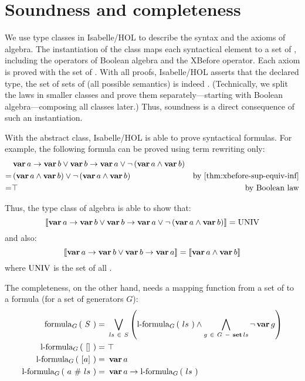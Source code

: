 \section{Soundness and completeness}
\label{sec:algebras-soundness-and-completeness}

We use type classes in Isabelle/HOL to describe the syntax and the axioms of \ac{algebra}.
The instantiation of the class maps each syntactical element to a set of \distinctlists, including the operators of Boolean algebra and the \ac{XBefore} operator.
Each axiom is proved with the set of \distinctlists.
With all proofs, Isabelle/HOL asserts that the declared type, the set of sets of \distinctlists (all possible semantics) is indeed .
(Technically, we split the laws in smaller classes and prove them separately---starting with Boolean algebra---composing all classes later.)
Thus, soundness is a direct consequence of such an instantiation.

With the abstract class, Isabelle/HOL is able to prove syntactical formulas.
For example, the following formula can be proved using term rewriting only:
%
\begin{align*}
& \xbefore{\var{a}}{\var{b}} \lor 
	\xbefore{\var{b}}{\var{a}} \lor 
	\lnot \left(\var{a} \land \var{b}\right)\nonumber\\
= & \left(\var{a} \land \var{b}\right) \lor 
	\lnot \left(\var{a} \land \var{b} \right) 
	& \text{by \cref{thm:xbefore-sup-equiv-inf}}\nonumber\\
= & \top & \text{by Boolean law}
\end{align*}

Thus, the type class of \ac{algebra} is able to show that:
\[
\denote{\xbefore{\var{a}}{\var{b}} \lor 
	\xbefore{\var{b}}{\var{a}} \lor 
	\lnot \left(\var{a} \land \var{b}\right)} = \UNIV
\]
%
and also:
%
\[
\denote{\xbefore{\var{a}}{\var{b}} \lor \xbefore{\var{b}}{\var{a}}} =
\denote{\var{a} \land \var{b}}
\]
%
where $\UNIV$ is the set of all \distinctlists.

The completeness, on the other hand, needs a mapping function from a set of \distinctlists to a formula (for a set of generators $G$):
%
\begin{align}
\formulaof{S}{G} =~ & 
	\bigvee_{ls ~\in~ S} \left(
	\listformulaof{ls}{G}
	\land \bigwedge_{g ~\in~ G ~-~ \listset ls } \lnot \var{g}
	\right)
	\nonumber\\
\listformulaof{\emptylist}{G} =~ &\top\nonumber\\
\listformulaof{\listsin{a} }{G} =~ &\var{a}\nonumber\\
\listformulaof{\cons{a}{ls}}{G} =~ & \xbefore{\var{a}}{\listformulaof{ls}{G}} \nonumber	
\end{align}

